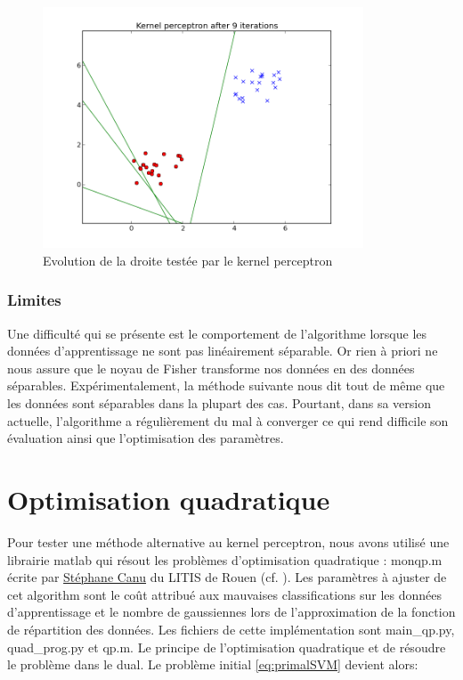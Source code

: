 \documentclass{article}
\begin{document}
\begin{figure}[!h]
\includegraphics[width=0.85\textwidth]{img/kp_pdf}
\caption{Evolution de la droite testée par le kernel perceptron}\label{test_kp}
\end{figure}

\subsubsection{Limites}
Une difficulté qui se présente est le comportement de l'algorithme lorsque les données d'apprentissage ne sont pas linéairement séparable. Or rien à priori ne nous assure que le noyau de Fisher transforme nos données en des données séparables. Expérimentalement, la méthode suivante nous dit tout de même que les données sont séparables dans la plupart des cas. Pourtant, dans sa version actuelle, l'algorithme a régulièrement du mal à converger ce qui rend difficile son évaluation ainsi que l'optimisation des paramètres.

\section{Optimisation quadratique}
\label{optquad}
Pour tester une méthode alternative au kernel perceptron, nous avons utilisé une librairie matlab qui résout les problèmes d'optimisation quadratique : monqp.m écrite par \href{http://asi.insa-rouen.fr/enseignants/~scanu/SVM/}{Stéphane Canu} du LITIS de Rouen (cf. \cite{Canu}).
Les paramètres à ajuster de cet algorithm sont le coût attribué aux mauvaises classifications sur les données d'apprentissage et le nombre de gaussiennes lors de l'approximation de la fonction de répartition des données. Les fichiers de cette implémentation sont main\_qp.py, quad\_prog.py et qp.m.
Le principe de l'optimisation quadratique et de résoudre le problème dans le dual. Le problème initial \ref{eq:primalSVM} devient alors:
\end{document}
